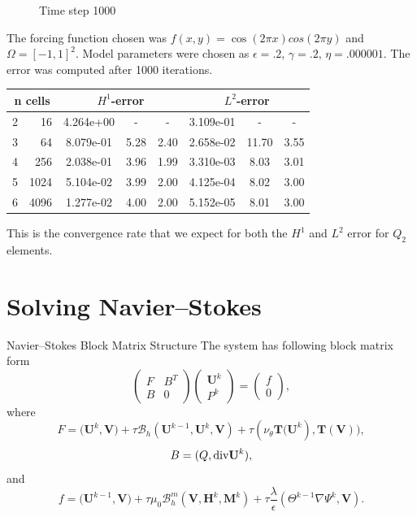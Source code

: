 \documentclass[9pt]{beamer}
\newcommand{\grad}{\nabla}
\newcommand{\diverg}{\textup{div} }
\newcommand{\eps}{\epsilon}
\begin{document}
\begin{frame}
\begin{minipage}{.4\paperwidth}
\begin{figure}[!b]
		\caption*{Time step 1000}
	\end{figure}
\end{minipage}
\end{frame}

\begin{frame}
	The forcing function chosen was $f(x,y) = \cos(2\pi x)cos(2\pi y)$ and $\Omega = [-1, 1]^2$. Model parameters were chosen as $\eps = .2$, $\gamma = .2$, $\eta = .000001$. The error was computed after 1000 iterations.
	
	\begin{table}[H]
		\begin{center}
			\begin{tabular}{|c|r|c|c|c|c|c|c|} \hline
				
				\multicolumn{2}{|c|}{n cells} & 
				\multicolumn{3}{|c|}{$H^1$-error} & 
				\multicolumn{3}{|c|}{$L^2$-error}\\ \hline
				2 & 16 & 4.264e+00 & - & - & 3.109e-01 & - & -\\ \hline
				3 & 64 & 8.079e-01 & 5.28 & 2.40 & 2.658e-02 & 11.70 & 3.55\\ \hline
				4 & 256 & 2.038e-01 & 3.96 & 1.99 & 3.310e-03 & 8.03 & 3.01\\ \hline
				5 & 1024 & 5.104e-02 & 3.99 & 2.00 & 4.125e-04 & 8.02 & 3.00\\ \hline
				6 & 4096 & 1.277e-02 & 4.00 & 2.00 & 5.152e-05 & 8.01 & 3.00\\ \hline
			\end{tabular}
		\end{center}
	\end{table}

	This is the convergence rate that we expect for both the $H^1$ and $L^2$ error for $Q_2$ elements.
\end{frame}

\section{Solving Navier--Stokes}
\begin{frame}{Navier--Stokes Block Matrix Structure}
	The system has following block matrix form
	$$\begin{pmatrix}
	F & B^T \\
	B & 0
	\end{pmatrix}
	\begin{pmatrix}
	\mathbf{U}^k\\
	P^k
	\end{pmatrix} = 
	\begin{pmatrix}
	f\\
	0
	\end{pmatrix},
	$$
	where 
	$$
		F = \big(\mathbf{U}^k, \mathbf{V}\big) + \tau\mathcal{B}_h(\mathbf{U}^{k-1}, \mathbf{U}^k, \mathbf{V}) + \tau(\nu_\theta\mathbf{T(U}^k), \mathbf{T(V)}),
	$$
	$$
		B = (Q, \diverg\mathbf{U}^k),
	$$
	and 
	$$
		f = \big(\mathbf{U}^{k-1}, \mathbf{V}\big) + \tau\mu_0\mathcal{B}_h^m(\mathbf{V}, \mathbf{H}^k, \mathbf{M}^k) + \tau\frac{\lambda}{\eps}(\Theta^{k-1}\grad \Psi^k, \mathbf{V}).
	$$
\end{frame}
\end{document}
